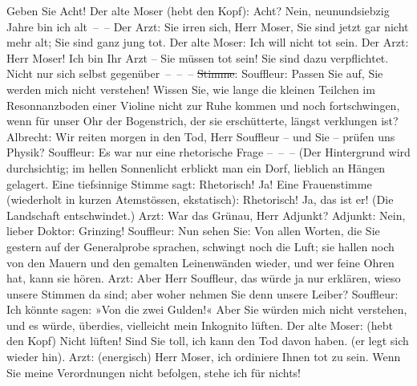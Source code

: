 \documentclass[twoside=false,titlepage=false,open=any, parskip=never, fontsize=12pt, headings=small, chapterprefix=false, appendixprefix=false]{scrbook}
\newcommand{\strikeout}[1]{\sout{#1}}
\newcommand{\Theight}{\dimexpr\fontcharht\font`W}
\newcommand{\pbposition}{\depth}
\newcommand{\pb}{\nobreak\hspace{0pt}\raisebox{-0.1em}{\raisebox{\pbposition}{\textnormal{|}}}\nobreak\hspace{0pt}}
\newcommand{\introOben}{\textnormal{\raisebox{\Theight}{\raisebox{-\height}{\small{v}\normalsize}}}}
\begin{document}
					Geben Sie Acht!\pend
           \pstart
           Der alte Moser (hebt den Kopf): Acht? Nein, neunundsiebzig Jahre bin ich
					alt – –\pend
           \pstart
           Der Arzt: Sie irren sich, Herr Moser, Sie sind jetzt gar nicht mehr alt; Sie sind
					ganz jung tot.\pend
           \pstart
           Der alte Moser: Ich will nicht tot sein.\pend
           \pstart
           Der Arzt: Herr Moser! Ich bin Ihr Arzt – Sie müssen tot sein! Sie sind dazu
					verpflichtet. Nicht nur sich selbst gegenüber – – –\pend
           \pstart
           \introOben{}\strikeout{Stimme}: \introOben{}Souffleur: Passen Sie auf, Sie
					werden mich nicht verstehen! Wissen Sie, wie lange die kleinen Teilchen im
					Resonnanzboden einer Violine nicht zur Ruhe kommen und noch
					fortschwingen, wenn für unser Ohr der Bogenstrich, der sie erschütterte, längst
					verklungen ist?\pend
           \pstart
           Albrecht: Wir reiten morgen in den Tod, Herr Souffleur – und Sie – prüfen uns
					Physik?\pend
           \pstart
           {\pb}Souffleur: Es war nur eine
					rhetorische Frage – – –\pend
           \pstart
           (Der Hintergrund wird durchsichtig; im hellen Sonnenlicht erblickt man ein Dorf,
					lieblich an Hängen gelagert. Eine tiefsinnige Stimme sagt:\pend
           \pstart
           Rhetorisch! Ja!\pend
           \pstart
           Eine Frauenstimme (wiederholt in kurzen Atemstössen, ekstatisch): Rhetorisch! Ja,
					das ist er!\pend
           \pstart
           (Die Landschaft entschwindet.)\pend
           \pstart
           Arzt: War das Grünau, Herr Adjunkt?\pend
           \pstart
           Adjunkt: Nein, lieber Doktor: Grinzing!\pend
           \pstart
           Souffleur: Nun sehen Sie: Von allen Worten, die Sie gestern auf der Generalprobe
					sprachen, schwingt noch die Luft; sie hallen noch von den Mauern und den
					gemalten Leinenwänden wieder, und wer feine Ohren hat, kann sie hören.\pend
           \pstart
           Arzt: Aber Herr Souffleur, das würde ja nur erklären, wieso unsere Stimmen da
					sind; aber woher nehmen Sie denn unsere Leiber?\pend
           \pstart
           Souffleur: Ich könnte sagen: »Von die zwei Gulden!« Aber Sie würden mich nicht
					verstehen, und es würde, überdies, vielleicht mein Inkognito lüften.\pend
           \pstart
           Der alte Moser: (hebt den Kopf) Nicht lüften! Sind Sie toll, ich kann den Tod
					davon haben. (er legt sich wieder hin).\pend
           \pstart
           Arzt: (energisch) Herr Moser, ich ordiniere Ihnen tot zu sein. Wenn Sie meine
					Verordnungen nicht befolgen, stehe ich für nichts!\pend
\end{document}
